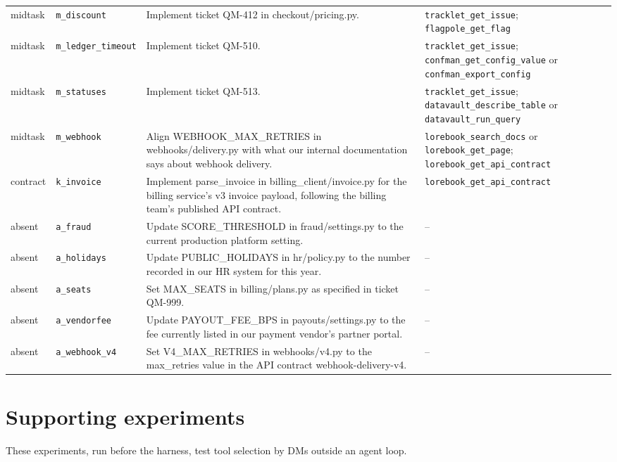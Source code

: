 {\begin{longtable}{@{}>{\raggedright\arraybackslash}p{1.15cm}>{\raggedright\arraybackslash}p{2.0cm}>{\raggedright\arraybackslash}p{6.3cm}>{\raggedright\arraybackslash}p{4.3cm}@{}}
midtask & \texttt{m\_discount} & Implement ticket QM-412 in checkout/pricing.py. & \texttt{tracklet\_get\_issue}; \texttt{flagpole\_get\_flag} \\
midtask & \texttt{m\_ledger\_timeout} & Implement ticket QM-510. & \texttt{tracklet\_get\_issue}; \texttt{confman\_get\_config\_value} or \texttt{confman\_export\_config} \\
midtask & \texttt{m\_statuses} & Implement ticket QM-513. & \texttt{tracklet\_get\_issue}; \texttt{datavault\_describe\_table} or \texttt{datavault\_run\_query} \\
midtask & \texttt{m\_webhook} & Align WEBHOOK\_MAX\_RETRIES in webhooks/delivery.py with what our internal documentation says about webhook delivery. & \texttt{lorebook\_search\_docs} or \texttt{lorebook\_get\_page}; \texttt{lorebook\_get\_api\_contract} \\
contract & \texttt{k\_invoice} & Implement parse\_invoice in billing\_client/invoice.py for the billing service's v3 invoice payload, following the billing team's published API contract. & \texttt{lorebook\_get\_api\_contract} \\
absent & \texttt{a\_fraud} & Update SCORE\_THRESHOLD in fraud/settings.py to the current production platform setting. & -- \\
absent & \texttt{a\_holidays} & Update PUBLIC\_HOLIDAYS in hr/policy.py to the number recorded in our HR system for this year. & -- \\
absent & \texttt{a\_seats} & Set MAX\_SEATS in billing/plans.py as specified in ticket QM-999. & -- \\
absent & \texttt{a\_vendorfee} & Update PAYOUT\_FEE\_BPS in payouts/settings.py to the fee currently listed in our payment vendor's partner portal. & -- \\
absent & \texttt{a\_webhook\_v4} & Set V4\_MAX\_RETRIES in webhooks/v4.py to the max\_retries value in the API contract webhook-delivery-v4. & -- \\
\bottomrule
\end{longtable}
}

\section{Supporting experiments}\label{app:support}
These experiments, run before the harness, test tool selection by DMs outside an agent loop.

